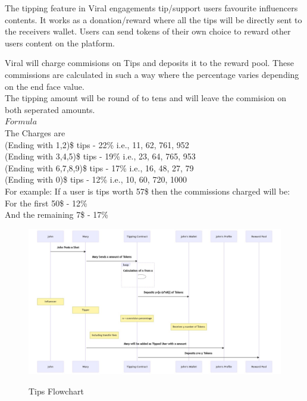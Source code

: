 \documentclass[10pt]{article}
\begin{document}
The tipping feature in Viral engagements tip/support user\textsc{}s favourite influencers\textsc{} contents. It works as a donation/reward where all the tips will be directly sent to the receivers wallet. Users can send tokens of their own choice to reward other users content on the platform.

Viral will charge commisions on Tips and deposits it to the reward pool. These commissions are calculated in such a way where the percentage varies depending on the end face value.\\

The tipping amount will be round of to tens and will leave the commision on both seperated amounts.\\

$Formula$\\

The Charges are\\


(Ending with 1,2)\$ tips     - 22\%      i.e., 11, 62, 761, 952\\
(Ending with 3,4,5)\$ tips   - 19\%      i.e., 23, 64, 765, 953\\
(Ending with 6,7,8,9)\$ tips - 17\%      i.e., 16, 48, 27,  79\\
(Ending with 0)\$ tips       - 12\%      i.e., 10, 60, 720, 1000\\


For example: If a user is tips worth 57\$ then the commissions charged will be:\\

For the first     50\$ - 12\%\\
And the remaining 7\$  - 17\%\\
\begin{figure}[H]
\includegraphics[width=\textwidth]{tips}\\
\caption{Tips Flowchart}
\end{figure}
\end{document}
